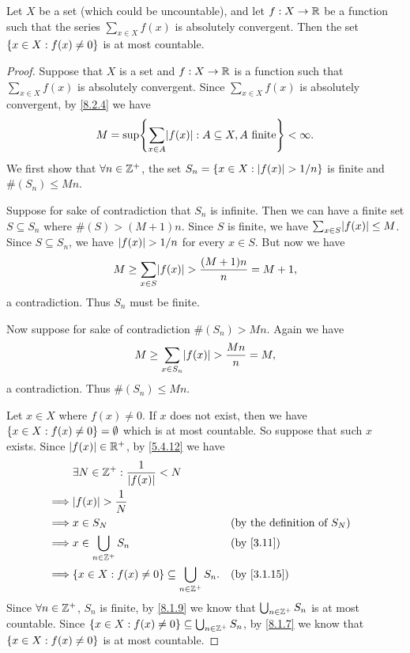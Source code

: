 \begin{lem}\label{8.2.5}
	Let \(X\) be a set (which could be uncountable), and let \(f : X \to \mathbb{R}\) be a function such that the series \(\sum_{x \in X} f(x)\) is absolutely convergent.
	Then the set \(\left\lbrace x \in X : f(x) \neq 0\right\rbrace\) is at most countable.
\end{lem}

\begin{proof}
	Suppose that \(X\) is a set and \(f : X \to \mathbb{R}\) is a function such that \(\sum_{x \in X} f(x)\) is absolutely convergent.
	Since \(\sum_{x \in X} f(x)\) is absolutely convergent, by \cref{8.2.4} we have
	\[
		M = \sup\set{\sum_{x \in A} \abs{f(x)} : A \subseteq X, A \text{ finite}} < \infty.
	\]
	We first show that \(\forall n \in \mathbb{Z}^+\), the set \(S_n = \left\lbrace x \in X : \left\lvert f(x)\right\rvert > 1 / n\right\rbrace\) is finite and \(\#(S_n) \leq Mn\).

	Suppose for sake of contradiction that \(S_n\) is infinite.
	Then we can have a finite set \(S \subseteq S_n\) where \(\#(S) > (M + 1)n\).
	Since \(S\) is finite, we have \(\sum_{x \in S} \abs{f(x)} \leq M\).
	Since \(S \subseteq S_n\), we have \(\left\lvert f(x)\right\rvert > 1 / n\) for every \(x \in S\).
	But now we have
	\[
		M \geq \sum_{x \in S} \abs{f(x)} > \dfrac{(M + 1)n}{n} = M + 1,
	\]
	a contradiction.
	Thus \(S_n\) must be finite.

	Now suppose for sake of contradiction \(\#(S_n) > Mn\).
	Again we have
	\[
		M \geq \sum_{x \in S_n} \abs{f(x)} > \dfrac{Mn}{n} = M,
	\]
	a contradiction.
	Thus \(\#(S_n) \leq Mn\).

	Let \(x \in X\) where \(f(x) \neq 0\).
	If \(x\) does not exist, then we have \(\left\lbrace x \in X : f(x) \neq 0\right\rbrace = \emptyset\) which is at most countable.
	So suppose that such \(x\) exists.
	Since \(\left\lvert f(x)\right\rvert \in \mathbb{R}^+\), by \cref{5.4.12} we have
	\begin{align*}
		         & \exists N \in \Z^+ : \dfrac{1}{\abs{f(x)}} < N                                                             \\
		\implies & \abs{f(x)} > \dfrac{1}{N}                                                                                  \\
		\implies & x \in S_N                                                       &  & \text{(by the definition of \(S_N\))} \\
		\implies & x \in \bigcup_{n \in \Z^+} S_n                                  &  & \by{3.11}                             \\
		\implies & \set{x \in X : f(x) \neq 0} \subseteq \bigcup_{n \in \Z^+} S_n. &  & \by{3.1.15}
	\end{align*}
	Since \(\forall n \in \mathbb{Z}^+\), \(S_n\) is finite, by \cref{8.1.9} we know that \(\bigcup_{n \in \mathbb{Z}^+} S_n\) is at most countable.
	Since \(\left\lbrace x \in X : f(x) \neq 0\right\rbrace \subseteq \bigcup_{n \in \mathbb{Z}^+} S_n\), by \cref{8.1.7} we know that \(\left\lbrace x \in X : f(x) \neq 0\right\rbrace\) is at most countable.
\end{proof}

